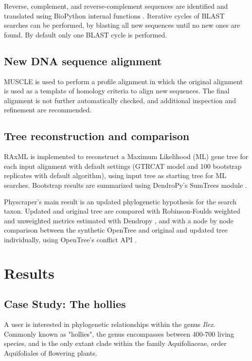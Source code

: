 \documentclass{bmcart}
\begin{document}
Reverse, complement, and reverse-complement sequences are identified and translated
using BioPython internal functions \cite{cock2009biopython}.
Iterative cycles of BLAST searches can be performed, by blasting all new sequences
until no new ones are found. By default only one BLAST cycle is performed.

\subsection*{New DNA sequence alignment}

MUSCLE \cite{edgar2004muscle} is used to perform a profile alignment in which the
original alignment is used as a template of homology criteria to align new sequences.
The final alignment is not further automatically checked, and additional inspection
and refinement are recommended.

\subsection*{Tree reconstruction and comparison}

RAxML \cite{stamatakis2014raxml} is implemented to reconstruct a Maximum Likelihood
(ML) gene tree for each input alignment with default settings (GTRCAT model and
100 bootstrap replicates with default algorithm), using input tree as starting
tree for ML searches.
Bootstrap results are summarized using DendroPy's SumTrees module
\cite{sukumaran2010dendropy}.

Physcraper's main result is an updated phylogenetic hypothesis for the search taxon.
Updated and original tree are compared with Robinson-Foulds weighted and unweighted
metrics estimated with Dendropy \cite{sukumaran2010dendropy}, and with a node by node
comparison between the synthetic OpenTree and original and updated tree individually,
using OpenTree's conflict API \cite{redelings2017supertree}.



\section*{Results}
\subsection*{Case Study: The hollies}

A user is interested in phylogenetic relationships within the genus \textit{Ilex}. Commonly
known as "hollies", the genus encompasses between 400-700 living species, and is
the only extant clade within the family Aquifoliaceae, order Aquifoliales of flowering
plants.
\end{document}
